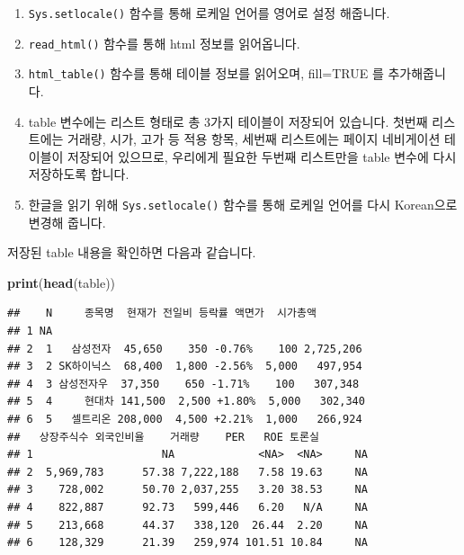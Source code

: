 \documentclass[12pt,]{book}
\newenvironment{Shaded}{\begin{snugshade}}{\end{snugshade}}
\newcommand{\DataTypeTok}[1]{\textcolor[rgb]{0.13,0.29,0.53}{#1}}
\newcommand{\DecValTok}[1]{\textcolor[rgb]{0.00,0.00,0.81}{#1}}
\newcommand{\KeywordTok}[1]{\textcolor[rgb]{0.13,0.29,0.53}{\textbf{#1}}}
\newcommand{\NormalTok}[1]{#1}
\newcommand{\OperatorTok}[1]{\textcolor[rgb]{0.81,0.36,0.00}{\textbf{#1}}}
\newcommand{\OtherTok}[1]{\textcolor[rgb]{0.56,0.35,0.01}{#1}}
\newcommand{\StringTok}[1]{\textcolor[rgb]{0.31,0.60,0.02}{#1}}
\providecommand{\tightlist}{%
  \setlength{\itemsep}{0pt}\setlength{\parskip}{0pt}}
\begin{document}
\begin{Shaded}
\end{Shaded}

\begin{enumerate}
\def\labelenumi{\arabic{enumi}.}
\tightlist
\item
  \texttt{Sys.setlocale()} 함수를 통해 로케일 언어를 영어로 설정 해줍니다.
\item
  \texttt{read\_html()} 함수를 통해 html 정보를 읽어옵니다.
\item
  \texttt{html\_table()} 함수를 통해 테이블 정보를 읽어오며, fill=TRUE 를 추가해줍니다.
\item
  table 변수에는 리스트 형태로 총 3가지 테이블이 저장되어 있습니다. 첫번째 리스트에는 거래량, 시가, 고가 등 적용 항목, 세번째 리스트에는 페이지 네비게이션 테이블이 저장되어 있으므로, 우리에게 필요한 두번째 리스트만을 table 변수에 다시 저장하도록 합니다.
\item
  한글을 읽기 위해 \texttt{Sys.setlocale()} 함수를 통해 로케일 언어를 다시 Korean으로 변경해 줍니다.
\end{enumerate}

저장된 table 내용을 확인하면 다음과 같습니다.

\begin{Shaded}
\begin{Highlighting}[]
\KeywordTok{print}\NormalTok{(}\KeywordTok{head}\NormalTok{(table))}
\end{Highlighting}
\end{Shaded}

\begin{verbatim}
##    N     종목명  현재가 전일비 등락률 액면가  시가총액
## 1 NA                                                  
## 2  1   삼성전자  45,650    350 -0.76%    100 2,725,206
## 3  2 SK하이닉스  68,400  1,800 -2.56%  5,000   497,954
## 4  3 삼성전자우  37,350    650 -1.71%    100   307,348
## 5  4     현대차 141,500  2,500 +1.80%  5,000   302,340
## 6  5   셀트리온 208,000  4,500 +2.21%  1,000   266,924
##   상장주식수 외국인비율    거래량    PER   ROE 토론실
## 1                    NA             <NA>  <NA>     NA
## 2  5,969,783      57.38 7,222,188   7.58 19.63     NA
## 3    728,002      50.70 2,037,255   3.20 38.53     NA
## 4    822,887      92.73   599,446   6.20   N/A     NA
## 5    213,668      44.37   338,120  26.44  2.20     NA
## 6    128,329      21.39   259,974 101.51 10.84     NA
\end{verbatim}
\end{document}

